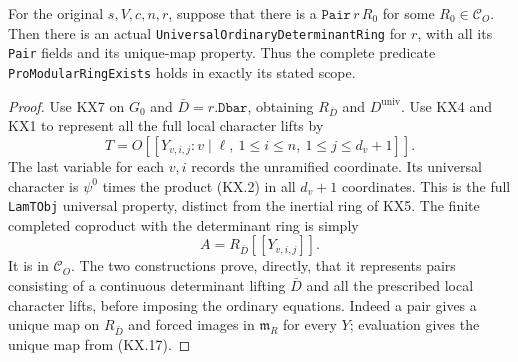 \begin{theorem}
\label{claim:KX8}
For the original $s,V,c,n,r$, suppose that there is a
$\texttt{Pair}\,r\,R_0$ for some $R_0\in\mathcal C_O$.
Then there is an actual \texttt{UniversalOrdinaryDeterminantRing}
for $r$, with all its \texttt{Pair} fields and its unique-map
property.  Thus the complete predicate
\texttt{ProModularRingExists} holds in exactly its stated scope.
\end{theorem}
\begin{proof}
Use KX7 on $G_0$ and $\bar D=r.\texttt{Dbar}$, obtaining
$R_{\bar D}$ and $D^{\mathrm{univ}}$.
Use KX4 and KX1 to represent all the full local character lifts by
\[
 T=O[[Y_{v,i,j}:v\mid\ell,\ 1\le i\le n,
                                         \ 1\le j\le d_v+1]].
                                                               \tag{KX.16}
\]
The last variable for each $v,i$ records the unramified coordinate.
Its universal character is $\psi^0$ times the product (KX.2)
in all $d_v+1$ coordinates.  This is the full \texttt{LamTObj}
universal property, distinct from the inertial ring of KX5.
The finite completed coproduct with the determinant ring is simply
\[
                 A=R_{\bar D}[[Y_{v,i,j}]].
                                                               \tag{KX.17}
\]
It is in $\mathcal C_O$.  The two constructions prove, directly,
that it represents pairs consisting of a continuous determinant
lifting $\bar D$ and all the prescribed local character lifts,
before imposing the ordinary equations.  Indeed a pair gives a
unique map on $R_{\bar D}$ and forced images in
$\mathfrak m_R$ for every $Y$; evaluation gives the unique map
from (KX.17).


\end{proof}
